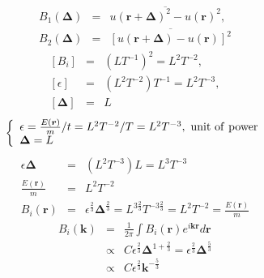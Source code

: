 \documentclass[aps,onecolumn,pra]{revtex4}
\begin{document}
    \begin{eqnarray}
		B_1 (\bm{\Delta}) & = & \overline{u(\bm{r}+\bm{\Delta})^2 - u(\bm{r})^2}, \\
		B_2 (\bm{\Delta}) & = & \overline{\left[
				u(\bm{r}+\bm{\Delta})-u(\bm{r})
			\right]^2}
    \end{eqnarray}
    \begin{eqnarray}
		\left[B_i\right] & = & \left( L T^{-1} \right)^2 = L^2 T^{-2}, \\
		\left[\epsilon\right] & = & \left( L^2 T^{-2} \right)T^{-1} = L^2 T^{-3}, \\
		\left[\bm{\Delta}\right] & = & L
    \end{eqnarray}
    \begin{eqnarray}
		\left\{
			\begin{array}{l}
				\epsilon = \frac{E(\bm{r})}{m}/t = L^2 T^{-2} / T = L^2 T^{-3}, \ {\rm unit \ of \ power}
				\\
				\bm{\Delta} = L
			\end{array}
		\right.
    \end{eqnarray}
    \begin{eqnarray}
		\epsilon \bm{\Delta} & = & (L^2 T^{-3})L = L^3 T^{-3} \\
		\frac{E(\bm{r})}{m} & = & L^2 T^{-2} \\
		B_i(\bm{r}) & = & \epsilon^{\frac{2}{3}} \bm{\Delta}^{\frac{2}{3}} = L^{3 \frac{2}{3}} T^{-3 \frac{2}{3}} = L^2 T^{-2} = \frac{E(\bm{r})}{m}
    \end{eqnarray}
    \begin{eqnarray}
		B_i(\bm{k}) & = & \frac{1}{2 \pi} \int B_i(\bm{r}) e^{i \bm{k} \bm{r}} d\bm{r}
		\\
		& \propto & C \epsilon^{\frac{2}{3}} \bm{\Delta}^{1 + \frac{2}{3}} = \epsilon^{\frac{2}{3}} \bm{\Delta}^{\frac{5}{3}}
		\\
		& \propto & C \epsilon^{\frac{2}{3}} \bm{k}^{-\frac{5}{3}}
    \end{eqnarray}
\end{document}
